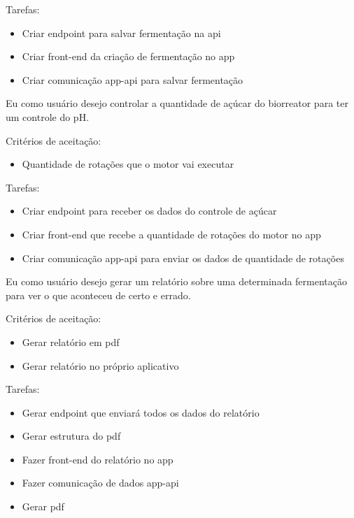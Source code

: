 Tarefas:
\begin{itemize}
  \item Criar endpoint para salvar fermentação na api
  \item Criar front-end da criação de fermentação no app
  \item Criar comunicação app-api para salvar fermentação
\end{itemize}


Eu como usuário desejo controlar a quantidade de açúcar do biorreator para ter um controle do pH.

Critérios de aceitação:
\begin{itemize}
  \item Quantidade de rotações que o motor vai executar
\end{itemize}

Tarefas:
\begin{itemize}
  \item Criar endpoint para receber os dados do controle de açúcar
  \item Criar front-end que recebe a quantidade de rotações do motor no app
  \item Criar comunicação app-api para enviar os dados de quantidade de rotações
\end{itemize}


Eu como usuário desejo gerar um relatório sobre uma determinada fermentação para ver o que aconteceu de certo e errado.

Critérios de aceitação:
\begin{itemize}
  \item Gerar relatório em pdf
  \item Gerar relatório no próprio aplicativo
\end{itemize}

Tarefas:
\begin{itemize}
  \item Gerar endpoint que enviará todos os dados do relatório
  \item Gerar estrutura do pdf
  \item Fazer front-end do relatório no app
  \item Fazer comunicação de dados app-api
  \item Gerar pdf
\end{itemize}


